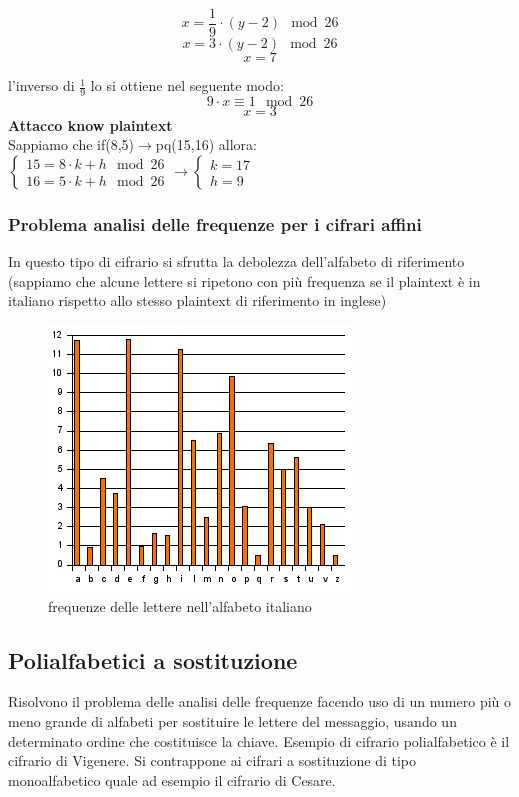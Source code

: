 \documentclass[10pt,a4paper]{article}
\begin{document}
$$x=\frac{1}{9}\cdot(y-2)\mod26$$
$$x=3\cdot(y-2)\mod26$$
$$x=7$$

l'inverso di $\frac{1}{9}$ lo si ottiene nel seguente modo:
$$9\cdot x\equiv 1\mod26$$
$$x=3$$
\newpage
\textbf{Attacco know plaintext} \\
Sappiamo che if(8,5)$\rightarrow$pq(15,16) allora:\\
$
\begin{cases}
15=8\cdot k+h \mod 26 \\
16 = 5\cdot k+h \mod26
\end{cases}
\rightarrow
\begin{cases}
k=17\\
h=9
\end{cases}
$
\subsubsection{Problema analisi delle frequenze per i cifrari affini}
In questo tipo di cifrario si sfrutta la debolezza dell'alfabeto di riferimento (sappiamo che alcune lettere si ripetono con più frequenza se il plaintext è in italiano rispetto allo stesso plaintext di riferimento in inglese)
\begin{figure}[htbp]
\includegraphics[scale=0.8]{immagini/Frequenze-alf_it.png}
\caption{frequenze delle lettere nell'alfabeto italiano}
\end{figure}

\subsection{Polialfabetici a sostituzione}
Risolvono il problema delle analisi delle frequenze facendo uso di un numero più o meno grande di alfabeti per sostituire le lettere del messaggio, usando un determinato ordine che costituisce la chiave. Esempio di cifrario polialfabetico è il cifrario di Vigenere. Si contrappone ai cifrari a sostituzione di tipo monoalfabetico quale ad esempio il cifrario di Cesare.
\end{document}
